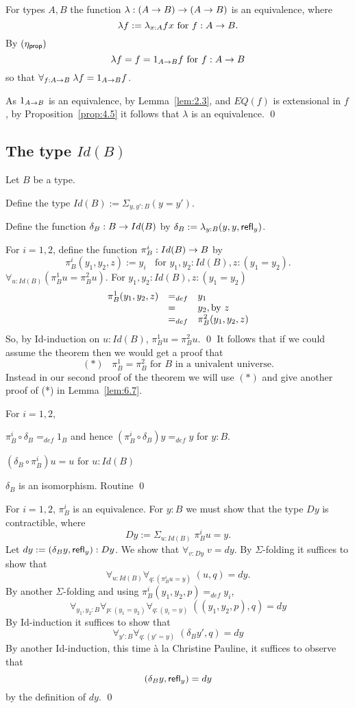  \label{cor:4.6}
For types $A,B$ the function $\lambda:(A\ra B)\ra(A\ra B)$ is an equivalence, where 
  \[ \lambda f := \lambda_{x:A} fx\mbox{ for } f:A\ra B.\]
\proof By $(\eta_{\sf prop})$
  \[ \lambda f = f = 1_{A\ra B}f\mbox{ for } f:A\ra B\]
so that $\forall_{f:A\ra B}\; \lambda f=1_{A\ra B}f$.

As $1_{A\ra B}$ is an equivalence, by Lemma~\ref{lem:2.3}, and $EQ(f)$ is extensional in $f$, by Proposition~\ref{prop:4.5} it follows that $\lambda$ is an equivalence.
\qed

\subsection{The type $Id(B)$}

 Let $B$ be a type.
\item Define the type $Id(B):=\Sigma_{y,y':B}(y=y')$.
\item Define the function $\delta_B:B\ra Id(B)$ by
$\delta_B:=\lambda_{y:B}(y,y,\refl{y})$.
\item For $i=1,2$, define  the function $\pi^i_B:Id(B)\ra B$ by
  \[ \pi^i_B(y_1,y_2,z):= y_i\;\;\mbox{ for }y_1,y_2:Id(B), z:(y_1=y_2).\]
$\forall_{u:Id(B)}(\pi^1_Bu = \pi^2_Bu)$.
\proof
For $y_1,y_2:Id(B), z:(y_1=y_2)$
  \[\be{array}{lll}
\pi^1_B(y_1,y_2,z)&=_{def}& y_1\\
                 &=&y_2, \mbox{by } z\\
                 &=_{def}&\pi^2_B(y_1,y_2,z)
  \en{array}\]
So, by Id-induction on $u:Id(B)$, $\pi^1_Bu = \pi^2_Bu$.  
\qed
It follows that if we could assume
the theorem then we would get a proof that 
  \[ (*)\;\;\;\pi^1_B = \pi^2_B\mbox{ for $B$ in a univalent universe.}\]  
Instead in our second proof of the theorem we will use $(*)$ 
and give another proof of (*) in Lemma~\ref{lem:6.7}.

\label{fe:lem-delta-equiv} \label{lem:4.9}
For $i=1,2$,
\item $\pi^i_B\circ\delta_B =_{def} 1_B$ and hence 
$(\pi^i_B\circ\delta_B)y =_{def} y$ for $y:B$.
\item $(\delta_B\circ\pi^i_B)u = u$ for $u:Id(B)$
\item $\delta_B$ is an isomorphism.
\proof Routine
\qed


\label{lem:4.10}
For $i=1,2$, $\pi^i_B$ is an equivalence.
\proof For $y:B$ we must show that the type $Dy$ is contractible, where
  \[ Dy := \Sigma_{u:Id(B)}\; \pi^i_Bu=y.\]
Let $dy:=(\delta_By,\refl{y}):Dy$.  We show that $\forall_{v:Dy}\; v=dy$.
By $\Sigma$-folding it suffices to show that
  \[ \forall_{u:Id(B)}\forall_{q:(\pi^i_Bu=y)}\; (u,q)=dy.\]
By another $\Sigma$-folding and using $\pi^i_B(y_1,y_2,p)=_{def}y_i$,
  \[\forall_{y_1,y_2:B}\forall_{p:(y_1=y_2)}\forall_{q:(y_i=y)}
       \;  ((y_1,y_2,p),q)=dy
  \]
By Id-induction it suffices to show that
  \[ \forall_{y':B}\forall_{q:(y'=y)}\; (\delta_By',q)=dy\]
By another Id-induction, this time \`{a} la Christine Pauline, it suffices to observe that
  \[ (\delta_By,\refl{y})=dy\]
by the definition of $dy$.
\qed

